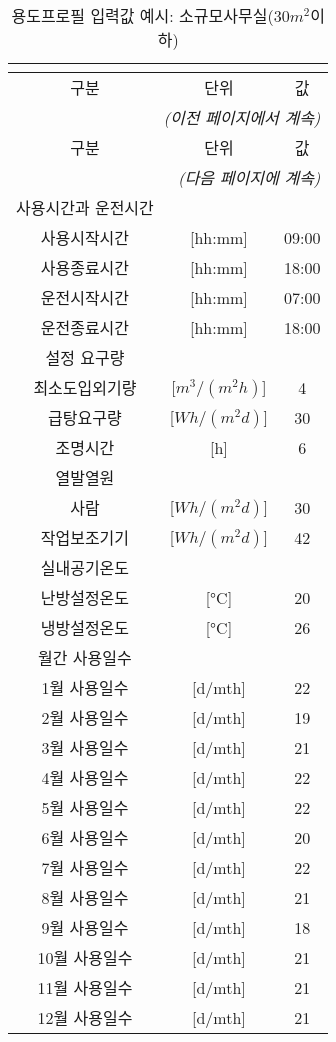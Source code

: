 \renewcommand{\arraystretch}{0.85}
\begin{longtable}{ccc}
  \caption{용도프로필 입력값 예시: 소규모사무실($30m^2$이하)} \\
  \label{tab:smallofficeusage} \\
  \toprule
  구분 & 단위 & 값 \\ \midrule
  \endfirsthead
  \multicolumn{3}{r}{\textit{(이전 페이지에서 계속)}} \\ \toprule
  구분 & 단위 & 값 \\ \midrule
  \endhead
  \midrule \multicolumn{3}{r}{\textit{(다음 페이지에 계속)}} \\ \bottomrule
  \endfoot
  \bottomrule
  \endlastfoot
  사용시간과 운전시간 & & \\
  \midrule
  사용시작시간 & [hh:mm] & 09:00 \\
  사용종료시간 & [hh:mm] & 18:00 \\
  운전시작시간 & [hh:mm] & 07:00 \\
  운전종료시간 & [hh:mm] & 18:00 \\
  \midrule
  설정 요구량 & & \\
  \midrule
  최소도입외기량 & [$m^3/(m^2h)$] & 4 \\
  급탕요구량 & [$Wh/(m^2d)$] & 30 \\
  조명시간 & [h] & 6 \\
  \midrule
  열발열원 & & \\
  \midrule
  사람 & [$Wh/(m^2d)$] & 30 \\
  작업보조기기 & [$Wh/(m^2d)$] & 42 \\
  \midrule
  실내공기온도 & & \\
  \midrule
  난방설정온도 & [°C] & 20 \\
  냉방설정온도 & [°C] & 26 \\
  \midrule
  월간 사용일수 & & \\
  \midrule
  1월 사용일수 & [d/mth] & 22 \\
  2월 사용일수 & [d/mth] & 19 \\
  3월 사용일수 & [d/mth] & 21 \\
  4월 사용일수 & [d/mth] & 22 \\  
  5월 사용일수 & [d/mth] & 22 \\
  6월 사용일수 & [d/mth] & 20 \\
  7월 사용일수 & [d/mth] & 22 \\
  8월 사용일수 & [d/mth] & 21 \\
  9월 사용일수 & [d/mth] & 18 \\
  10월 사용일수 & [d/mth] & 21 \\
  11월 사용일수 & [d/mth] & 21 \\
  12월 사용일수 & [d/mth] & 21 \\
\end{longtable}



